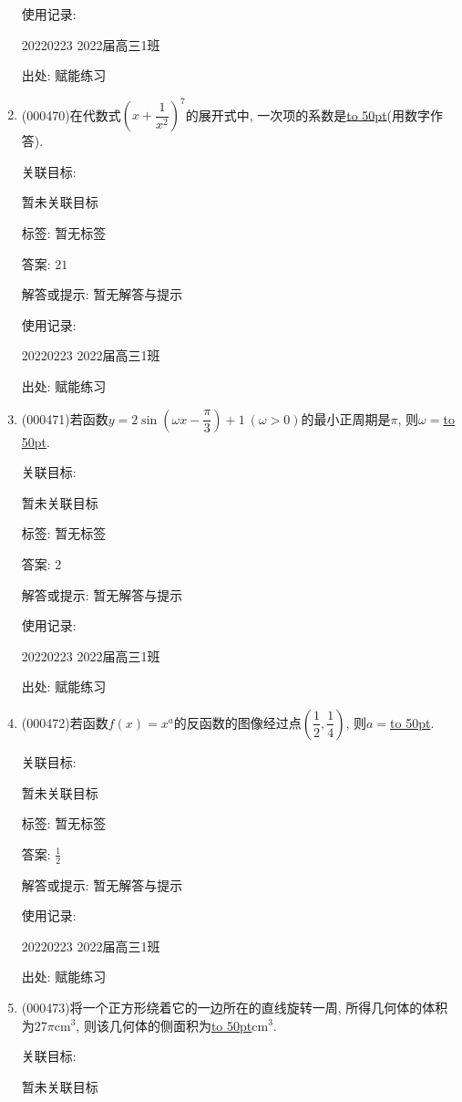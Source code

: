 \documentclass[10pt,a4paper]{article}
\newcommand{\blank}[1]{\underline{\hbox to #1pt{}}}
\begin{document}
\begin{enumerate}[1.]
使用记录:

20220223	2022届高三1班	


出处: 赋能练习
\item { (000470)}在代数式$(x+\dfrac 1{x^2})^7$的展开式中, 一次项的系数是\blank{50}(用数字作答).


关联目标:

暂未关联目标



标签: 暂无标签

答案: $21$

解答或提示: 暂无解答与提示

使用记录:

20220223	2022届高三1班	


出处: 赋能练习
\item { (000471)}若函数$y=2\sin (\omega x-\dfrac\pi 3)+1 \ (\omega >0)$的最小正周期是$\pi$, 则$\omega=$\blank{50}.


关联目标:

暂未关联目标



标签: 暂无标签

答案: $2$

解答或提示: 暂无解答与提示

使用记录:

20220223	2022届高三1班	


出处: 赋能练习
\item { (000472)}若函数$f(x)=x^a$的反函数的图像经过点$(\dfrac12,\dfrac14)$, 则$a=$\blank{50}.


关联目标:

暂未关联目标



标签: 暂无标签

答案: $\frac 12$

解答或提示: 暂无解答与提示

使用记录:

20220223	2022届高三1班	


出处: 赋能练习
\item { (000473)}将一个正方形绕着它的一边所在的直线旋转一周, 所得几何体的体积为$27\pi\text{cm}^3$, 则该几何体的侧面积为\blank{50}$\text{cm}^3$.


关联目标:

暂未关联目标




\end{enumerate}
\end{document}
